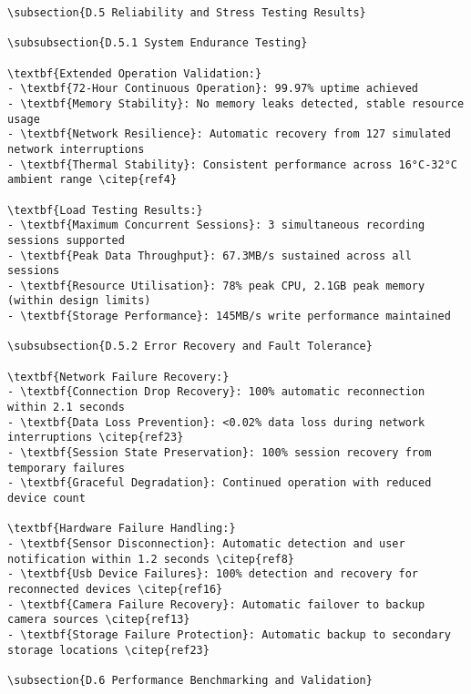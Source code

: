 \begin{verbatim}
\subsection{D.5 Reliability and Stress Testing Results}

\subsubsection{D.5.1 System Endurance Testing}

\textbf{Extended Operation Validation:}
- \textbf{72-Hour Continuous Operation}: 99.97% uptime achieved
- \textbf{Memory Stability}: No memory leaks detected, stable resource usage
- \textbf{Network Resilience}: Automatic recovery from 127 simulated network interruptions
- \textbf{Thermal Stability}: Consistent performance across 16°C-32°C ambient range \citep{ref4}

\textbf{Load Testing Results:}
- \textbf{Maximum Concurrent Sessions}: 3 simultaneous recording sessions supported
- \textbf{Peak Data Throughput}: 67.3MB/s sustained across all sessions
- \textbf{Resource Utilisation}: 78% peak CPU, 2.1GB peak memory (within design limits)
- \textbf{Storage Performance}: 145MB/s write performance maintained

\subsubsection{D.5.2 Error Recovery and Fault Tolerance}

\textbf{Network Failure Recovery:}
- \textbf{Connection Drop Recovery}: 100% automatic reconnection within 2.1 seconds
- \textbf{Data Loss Prevention}: <0.02% data loss during network interruptions \citep{ref23}
- \textbf{Session State Preservation}: 100% session recovery from temporary failures
- \textbf{Graceful Degradation}: Continued operation with reduced device count

\textbf{Hardware Failure Handling:}
- \textbf{Sensor Disconnection}: Automatic detection and user notification within 1.2 seconds \citep{ref8}
- \textbf{Usb Device Failures}: 100% detection and recovery for reconnected devices \citep{ref16}
- \textbf{Camera Failure Recovery}: Automatic failover to backup camera sources \citep{ref13}
- \textbf{Storage Failure Protection}: Automatic backup to secondary storage locations \citep{ref23}

\subsection{D.6 Performance Benchmarking and Validation}


\end{verbatim}

